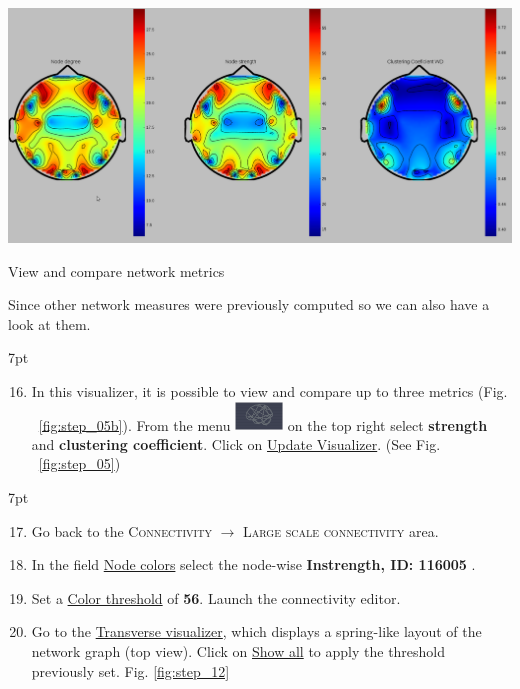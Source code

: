 \documentclass{tufte-handout}
\newenvironment{formal}{%
  \def\FrameCommand{%
    \hspace{1pt}%
    {\color{DarkBlue}\vrule width 2pt}%
    {\color{formalshade}\vrule width 4pt}%
    \colorbox{formalshade}%
  }%
  \MakeFramed{\advance\hsize-\width\FrameRestore}%
  \noindent\hspace{-4.55pt}%
  \begin{adjustwidth}{}{7pt}%
  \vspace{2pt}\vspace{2pt}%
}
{%
  \vspace{2pt}\end{adjustwidth}\endMakeFramed%
}
\begin{document}
\begin{marginfigure}
  \includegraphics[width=\linewidth]{Handout_UI_ModellingStructuralLesions_AnalysisResultCompare}%
  \caption{View and compare network metrics}%
  \label{fig:step_05b}%
\end{marginfigure}
\noindent Since other network measures were previously computed so we can also have a look at them. 
\begin{formal}
  \begin{enumerate}[resume] %
  \setcounter{enumi}{15}
  \item In this visualizer, it is possible to view and compare up to three metrics (Fig. ~\ref{fig:step_05b}). From the menu \includegraphics[width=0.1\textwidth]{butt_brain_menu} on the top right select \textbf{strength} and \textbf{clustering coefficient}. Click on \underline{Update Visualizer}. (See Fig. ~\ref{fig:step_05})
  \end{enumerate}
\end{formal}

\begin{formal}
  \begin{enumerate}[resume] %
  \setcounter{enumi}{16}
  \item Go back to the \textsc{Connectivity} $\rightarrow$ \textsc{Large scale connectivity} area. 
  \item  In the field \underline{Node colors} select
the node-wise \textbf{Instrength, ID: 116005} .
\item Set a \underline{Color threshold} of \textbf{56}. Launch the connectivity editor.
  \item Go to the \underline{Transverse visualizer}, which displays a spring-like layout of the network graph (top view). Click on \underline{Show all} to apply the threshold previously set. Fig. \ref{fig:step_12}
  \end{enumerate}
\end{formal}
\end{document}
